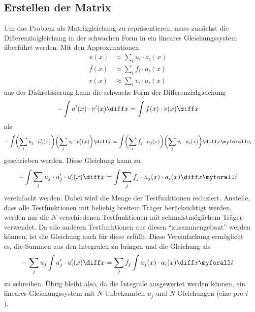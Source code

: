 \subsection{Erstellen der Matrix\label{fem:1d:matrix_erstellen}}
Um das Problem als Matrixgleichung zu repräsentieren, muss zunächst die Differenzialgleichung in der schwachen Form in ein lineares Gleichungssystem überführt werden.
Mit den Approximationen 
\begin{align}
    u(x) &\approx \sum_i u_i \cdot a_i(x) \\
    f(x) &\approx \sum_i f_i \cdot a_i(x) \\
    v(x) &\approx \sum_i v_i \cdot a_i(x)
\end{align}
aus der Diskretisierung kann die schwache Form der Differenzialgleichung 
\begin{equation}
    - \int u'(x) \cdot v'(x) \diff x = \int f(x) \cdot v(x) \diff x
\end{equation}
als
\begin{equation}
    - \int \biggl(\sum_i u_j \cdot a'_j(x)\biggr) \biggl(\sum_j v_i \cdot a'_i(x)\biggr) \diff x 
    = \int \biggl(\sum_i f_j \cdot a_j(x) \biggr) \biggl(\sum_j v_i \cdot a_i(x) \biggr) \diff x 
    \myforall v_i
\end{equation}
geschrieben werden.
Diese Gleichung kann zu
\begin{equation}
    - \int \sum_j u_j \cdot a'_j \cdot a'_i(x) \diff x = \int \sum_j f_j \cdot a_j(x) \cdot a_i(x) \diff x \myforall i
\end{equation}
vereinfacht werden.
Dabei wird die Menge der Testfunktionen reduziert.
Anstelle, dass alle Testfunktionen mit beliebig breitem Träger berücksichtigt werden, werden nur die $N$ verschiedenen Testfunktionen mit schmalstmöglichem Träger verwendet.
Da alle anderen Testfunktionen aus diesen ``zusammengebaut'' werden können, ist die Gleichung auch für diese erfüllt.
Diese Vereinfachung ermöglicht es, die Summen aus den Integralen zu bringen und die Gleichung als
\begin{equation}
    - \sum_j u_j \int a'_j \cdot a'_i(x) \diff x = \sum_j f_j \int a_j(x) \cdot a_i(x) \diff x \myforall i \label{papers:fem:prinzip1d:finale_gleichung}
\end{equation}
zu schreiben.
Übrig bleibt also, da die Integrale ausgewertet werden können, ein lineares Gleichungssystem mit $N$ Unbekannten $u_j$ und $N$ Gleichungen (eine pro $i$). 

